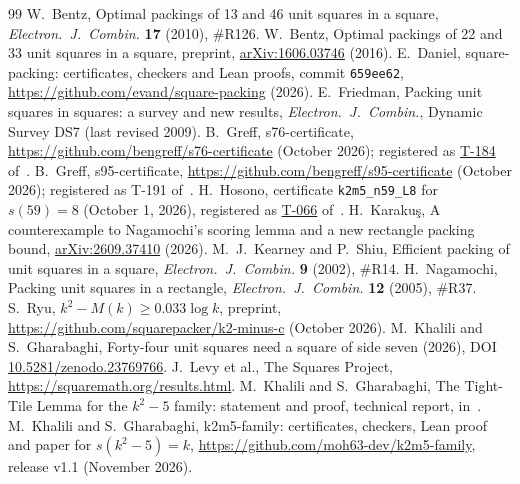 \documentclass[11pt]{amsart}
\theoremstyle{definition}
\theoremstyle{remark}
\begin{document}
\begin{thebibliography}{99}
 W.~Bentz, Optimal packings of 13 and 46 unit squares in a square, \emph{Electron.\ J.\ Combin.}
\textbf{17} (2010), \#R126.
 W.~Bentz, Optimal packings of 22 and 33 unit squares in a square, preprint,
\href{https://arxiv.org/abs/1606.03746}{arXiv:1606.03746} (2016).
 E.~Daniel, square-packing: certificates, checkers and Lean proofs, commit \texttt{659ee62},
\url{https://github.com/evand/square-packing} (2026).
 E.~Friedman, Packing unit squares in squares: a survey and new results,
\emph{Electron.\ J.\ Combin.}, Dynamic Survey DS7 (last revised 2009).
 B.~Greff, s76-certificate, \url{https://github.com/bengreff/s76-certificate} (October 2026);
registered as \href{https://squaremath.org/result/t-184.html}{T-184} of~\cite{squares}.
 B.~Greff, s95-certificate, \url{https://github.com/bengreff/s95-certificate} (October 2026);
registered as T-191 of~\cite{squares}.
 H.~Hosono, certificate \texttt{k2m5\_n59\_L8} for $s(59)=8$ (October 1, 2026), registered as
\href{https://squaremath.org/result/t-066.html}{T-066} of~\cite{squares}.
 H.~Karaku\c{s}, A counterexample to Nagamochi's scoring lemma and a new rectangle packing
bound, \href{https://arxiv.org/abs/2609.37410}{arXiv:2609.37410} (2026).
 M.~J.~Kearney and P.~Shiu, Efficient packing of unit squares in a square, \emph{Electron.\ J.\
Combin.} \textbf{9} (2002), \#R14.
 H.~Nagamochi, Packing unit squares in a rectangle, \emph{Electron.\ J.\ Combin.}
\textbf{12} (2005), \#R37.
 S.~Ryu, $k^2-M(k)\ge0.033\log k$, preprint, \url{https://github.com/squarepacker/k2-minus-c}
(October 2026).
 M.~Khalili and S.~Gharabaghi, Forty-four unit squares need a square of side seven (2026),
DOI \href{https://doi.org/10.5281/zenodo.23769766}{10.5281/zenodo.23769766}.
\bibitem{squares} J.~Levy et al., The Squares Project, \url{https://squaremath.org/results.html}.
\bibitem{ttproof} M.~Khalili and S.~Gharabaghi, The Tight-Tile Lemma for the $k^2-5$ family: statement and proof,
technical report, in~\cite{repo}.
 M.~Khalili and S.~Gharabaghi, k2m5-family: certificates, checkers, Lean proof and paper for
$s(k^2-5)=k$, \url{https://github.com/moh63-dev/k2m5-family}, release v1.1 (November 2026).
\end{thebibliography}
\end{document}

